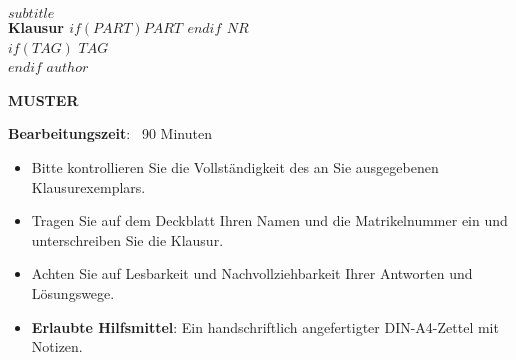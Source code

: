 
\begin{coverpages}
    \begin{minipage}[c]{0.75\textwidth}
        \parindent0pt
        \textcolor{headcolor}{\large\scshape{$subtitle$}}\\[1ex]
        \textcolor{headcolor}{\Large\textbf{Klausur $if(PART)$$PART$ \xspace$endif$ $NR$}}\\[2ex]
        $if(TAG)$
        \textbf{$TAG$}\\[2ex]
        $endif$
        \parindent0pt
        $author$
    \end{minipage}
    \begin{minipage}[c]{0.25\textwidth}
        \ifprintanswers
        \hfill\textcolor{dkred}{\textbf{\Huge MUSTER}}\hfill\hfill
        \fi
    \end{minipage}
    \vspace{10mm}
    \par\hrulefill\par
    \begin{minipage}[c]{0.5\textwidth}
        \begin{minipage}[c]{0.96\textwidth}
            \vspace{2mm}
            {\textbf{Bearbeitungszeit}: {\ }90 Minuten}\par
            \bigskip
            \begin{itemize}
                \item Bitte kontrollieren Sie die Vollständigkeit des an Sie
                ausgegebenen Klausurexemplars.
                \medskip
                \item Tragen Sie auf dem Deckblatt Ihren Namen und die
                Matrikelnummer ein und unterschreiben Sie die Klausur.
                \medskip
                \item Achten Sie auf Lesbarkeit und Nachvollziehbarkeit Ihrer
                Antworten und Lösungswege.
                \medskip
                \item \textbf{Erlaubte Hilfsmittel}: Ein handschriftlich
                angefertigter DIN-A4-Zettel mit Notizen.


\end{itemize}
\end{minipage}
\end{minipage}
\end{coverpages}

